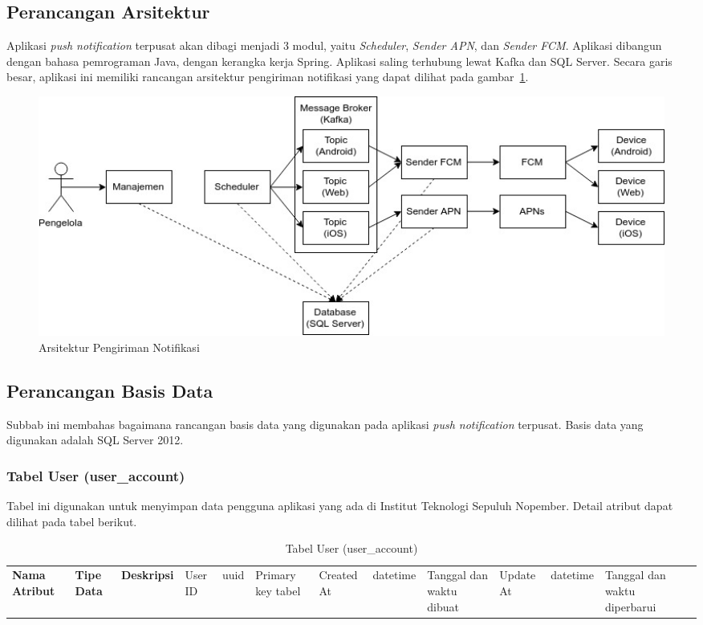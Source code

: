 \subsection{Perancangan Arsitektur}
\par Aplikasi \textit{push notification} terpusat akan dibagi menjadi 3 modul, yaitu \textit{Scheduler},
\textit{Sender APN}, dan \textit{Sender FCM}.
Aplikasi dibangun dengan bahasa pemrograman Java, dengan kerangka kerja
Spring.
Aplikasi saling terhubung lewat Kafka dan SQL Server.
Secara garis besar, aplikasi ini memiliki rancangan
arsitektur pengiriman notifikasi yang dapat dilihat pada gambar~\ref{arsitektur_pengiriman_notifikasi}.
\begin{figure}[H]
    \centering\includegraphics[width=1\textwidth]{bab3/figures/arsitektur_pengiriman_notifikasi.jpg}
    \caption{Arsitektur Pengiriman Notifikasi}
    \label{arsitektur_pengiriman_notifikasi}
\end{figure}

\subsection{Perancangan Basis Data}
\par Subbab ini membahas bagaimana rancangan basis data yang digunakan pada aplikasi \textit{push notification}
terpusat.
Basis data yang digunakan adalah SQL Server 2012.

\subsubsection{Tabel User (user\_account)}
\par Tabel ini digunakan untuk menyimpan data pengguna aplikasi yang ada di Institut Teknologi Sepuluh Nopember. Detail atribut dapat dilihat pada tabel berikut.
\begin{longtable}{|p{2.5cm}|p{2cm}|p{4.5cm}|}
    \hline
    \textbf{Nama Atribut} & \textbf{Tipe Data} & \textbf{Deskripsi} & \hline
    User ID & uuid & Primary key tabel & \hline
    Created At & datetime & Tanggal dan waktu dibuat & \hline
    Update At & datetime & Tanggal dan waktu diperbarui & \hline
    \caption{Tabel User (user\_account)}
\end{longtable}

